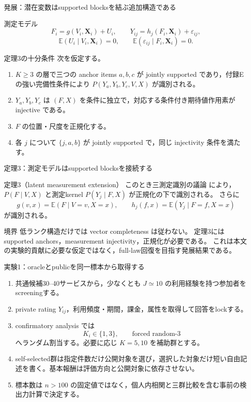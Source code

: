 \documentclass[aspectratio=169,10pt]{beamer}
\newcommand{\E}{\mathbb{E}}
\newcommand{\1}{\mathbf{1}}
\newcommand{\X}{\bm{X}}
\begin{document}
\begin{frame}{発展：潜在変数はsupported blocksを結ぶ追加構造である}
\begin{block}{測定モデル}
\scriptsize
\[
F_i=g(V_i,\X_i)+U_i,
\qquad
Y_{ij}=h_j(F_i,\X_i)+\varepsilon_{ij},
\]
\[
\E(U_i\mid V_i,\X_i)=0,
\qquad
\E(\varepsilon_{ij}\mid F_i,\X_i)=0.
\]
\end{block}
\begin{alertblock}{定理3の十分条件}
次を仮定する。
\begin{enumerate}
\item $K\ge3$ の層で三つの anchor items $a,b,c$ が jointly supported であり，付録Eの強い完備性条件により $P(Y_a,Y_b,Y_c,V,X)$ が識別される。
\item $Y_a,Y_b,Y_c$ は $(F,X)$ を条件に独立で，対応する条件付き期待値作用素が injective である。
\item $F$ の位置・尺度を正規化する。
\item 各 $j$ について $\{j,a,b\}$ が jointly supported で，同じ injectivity 条件を満たす。
\end{enumerate}
\end{alertblock}
\end{frame}

\begin{frame}{定理3：測定モデルはsupported blocksを接続する}
\begin{alertblock}{定理3（latent measurement extension）}
このとき三測定識別の議論 \parencite{HuSchennach2008} により，
$P(F\mid V,X)$ と測定kernel $P(Y_j\mid F,X)$ が正規化の下で識別される。
さらに
\[
g(v,x)=\E(F\mid V=v,X=x),
\qquad
h_j(f,x)=\E(Y_j\mid F=f,X=x)
\]
が識別される。
\end{alertblock}
\begin{block}{境界}
低ランク構造だけでは vector completeness は従わない。
定理3には supported anchors，measurement injectivity，正規化が必要である。
これは本文の実験的貢献に必要な仮定ではなく，full-law回復を目指す発展結果である。
\end{block}
\end{frame}

\begin{frame}{実験1：oracleとpublicを同一標本から取得する}
\begin{enumerate}
\item 共通候補30--40サービスから，少なくとも $J\simeq10$ の利用経験を持つ参加者をscreeningする。
\item private rating $Y_{ij}$，利用頻度・期間，課金，属性を取得して回答をlockする。
\item confirmatory analysis では
\[
K_i\in\{1,3\},\qquad \text{forced random-3}
\]
へランダム割当する。必要に応じ $K=5,10$ を補助群とする。
\item self-selected群は指定件数だけ公開対象を選び，選択した対象だけ短い自由記述を書く。基本報酬は評価方向と公開対象に依存させない。
\item 標本数は $n>100$ の固定値ではなく，個人内相関と三群比較を含む事前の検出力計算で決定する。
\end{enumerate}
\end{frame}
\end{document}
